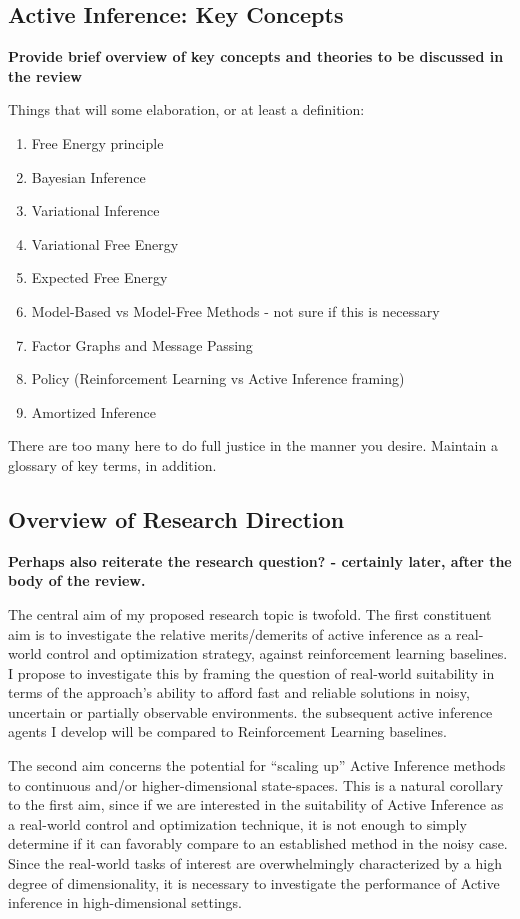 \documentclass[onecolumn]{IEEEtran}
\begin{document}
\subsection{Active Inference: Key Concepts} 
\textbf{Provide brief overview of key concepts and theories to be discussed in the review}

Things that will some elaboration, or at least a definition:

\begin{enumerate}
	\item Free Energy principle
	\item Bayesian Inference
	\item Variational Inference
	\item Variational Free Energy
	\item Expected Free Energy
	\item Model-Based vs Model-Free Methods - not sure if this is necessary
	\item Factor Graphs and Message Passing
	\item Policy (Reinforcement Learning vs Active Inference framing)
	\item Amortized Inference
\end{enumerate}

There are too many here to do full justice in the manner you desire. Maintain a glossary of key terms, in addition.

\subsection{Overview of Research Direction}

\textbf{Perhaps also reiterate the research question? - certainly later, after the body of the review.}

The central aim of my proposed research topic is twofold. The first constituent aim is to investigate the relative merits/demerits of active inference as a real-world control and optimization strategy, against reinforcement learning baselines. I propose to investigate this by framing the question of real-world suitability in terms of the approach's ability to afford fast and reliable solutions in noisy, uncertain or partially observable environments. the subsequent active inference agents I develop will be compared to Reinforcement Learning baselines. 

The second aim concerns the potential for ``scaling up'' Active Inference methods to continuous and/or higher-dimensional state-spaces. This is a natural corollary to the first aim, since if we are interested in the suitability of Active Inference as a real-world control and optimization technique, it is not enough to simply determine if it can favorably compare to an established method in the noisy case. Since the real-world tasks of interest are overwhelmingly characterized by a high degree of dimensionality, it is necessary to investigate the performance of Active inference in high-dimensional settings.  
\end{document}
